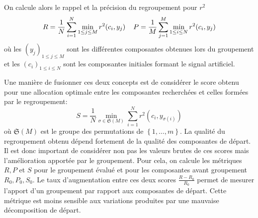 \documentclass{gretsi}
\newcommand{\set}[1]{\left \{ 1, \dots, #1 \right \}}
\begin{document}
    On calcule alors le rappel et la précision du regroupement pour $r^2$
    \begin{equation}
        R = \frac{1}{N} \sum_{i=1}^N \min_{1\le j\le M} r^2(c_i, y_j) \hspace{0.4cm} P = \frac{1}{M}\sum_{j=1}^M \min_{1\le i\le N} r^2(c_i, y_j)
    \end{equation}
    où les $( y_j)_{1\le j \le M}$ sont les différentes composantes obtenues lors du groupement et les $(c_i)_{1\le i\le N}$ sont les composantes initiales formant le signal artificiel.
    
    Une manière de fusionner ces deux concepts est de considérer le score obtenu pour une allocation optimale entre les composantes recherchées et celles formées par le regroupement:
    \begin{equation}
        S =  \frac{1}{N} \min_{\sigma \in \mathfrak S(M)} \sum_{i=1}^N r^2(c_i, y_{\sigma(i)})
    \end{equation}
    où $\mathfrak S(M)$ est le groupe des permutations de $\set{m}$.
    La qualité du regroupement obtenu dépend fortement de la qualité des composantes de départ.
    Il est donc important de considérer non pas les valeurs brutes de ces scores mais l'amélioration apportée par le groupement.
    Pour cela, on calcule les métriques $R, P$ et $S$ pour le groupement évalué et pour les composantes avant groupement $R_0, P_0, S_0$.
    Le taux d'augmentation entre ces deux scores $\frac{R-R_0}{R_0}$ permet de mesurer l'apport d'un groupement par rapport aux composantes de départ.
    Cette métrique est moins sensible aux variations produites par une mauvaise décomposition de départ.
    

% 
    
\end{document}
